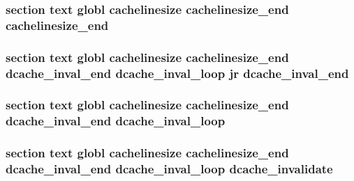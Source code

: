 \hypertarget{mips_2cache_8S_af5c24722116775c4c23de29430fa84bb}{
\subsubsection[{cachelinesize\-\_\-end}]{\setlength{\rightskip}{0pt plus 5cm}section text globl {\bf cachelinesize} cachelinesize\-\_\-end cachelinesize\-\_\-end}}\label{mips_2cache_8S_af5c24722116775c4c23de29430fa84bb}
\hypertarget{mips_2cache_8S_af97c183dce4888af33c2cb9b767bf0f5}{
\subsubsection[{dcache\-\_\-inval\-\_\-end}]{\setlength{\rightskip}{0pt plus 5cm}section text globl {\bf cachelinesize} {\bf cachelinesize\-\_\-end} dcache\-\_\-inval\-\_\-end {\bf dcache\-\_\-inval\-\_\-loop} jr dcache\-\_\-inval\-\_\-end}}\label{mips_2cache_8S_af97c183dce4888af33c2cb9b767bf0f5}
\hypertarget{mips_2cache_8S_a459bb079d7d84a2808893e96da86d2df}{
\subsubsection[{dcache\-\_\-inval\-\_\-loop}]{\setlength{\rightskip}{0pt plus 5cm}section text globl {\bf cachelinesize} {\bf cachelinesize\-\_\-end} {\bf dcache\-\_\-inval\-\_\-end} dcache\-\_\-inval\-\_\-loop}}\label{mips_2cache_8S_a459bb079d7d84a2808893e96da86d2df}
\hypertarget{mips_2cache_8S_a6b1cee7dfcedefdfff3639527ddaca97}{
\subsubsection[{dcache\-\_\-invalidate}]{\setlength{\rightskip}{0pt plus 5cm}section text globl {\bf cachelinesize} {\bf cachelinesize\-\_\-end} {\bf dcache\-\_\-inval\-\_\-end} {\bf dcache\-\_\-inval\-\_\-loop} dcache\-\_\-invalidate}}\label{mips_2cache_8S_a6b1cee7dfcedefdfff3639527ddaca97}


